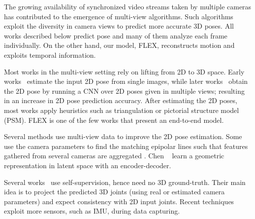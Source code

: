 The growing availability of synchronized video streams taken by multiple cameras has contributed to the emergence of multi-view algorithms. Such algorithms exploit the diversity in camera views to predict more accurate 3D poses. All works described below predict pose and many of them analyze each frame individually. On the other hand, our model, FLEX, reconstructs motion and exploits temporal information. 

Most works in the multi-view setting rely on lifting from 2D to 3D space.
Early works~\cite{Belagiannis_2016_IEEE,detection_complete_graphs,psm_2013} estimate the input 2D pose from single images, while later works~\cite{dong2019fast,qiu2019cross,iskakov2019learnable,he2020epipolar,kocabas2019selfsupervised,chen2019weaklysupervised,chu_and_pan_semisupervised,rhodin2018learning,kadkhodamohammadi2019generalizable,chu2021partaware} obtain the 2D pose by running a CNN over 2D poses given in multiple views; resulting in an increase in 2D pose prediction accuracy.
After estimating the 2D poses, most works apply heuristics such as triangulation or pictorial structure model (PSM). FLEX is one of the few works \cite{iskakov2019learnable,tu2020voxelpose} that present an end-to-end model. 

Several methods 
use multi-view data to improve the 2D pose estimation.
Some use the camera parameters to find the matching epipolar lines %
such that features gathered from several cameras are aggregated \cite{qiu2019cross,he2020epipolar}. 
Chen \etal~ learn a geometric representation in latent space with an encoder-decoder.

Several works~\cite{kocabas2019selfsupervised,chu_and_pan_semisupervised,wandt2020canonpose,tome2018rethinking} use self-supervision, hence need no 3D ground-truth.
Their main idea is to project the predicted 3D joints (using real or estimated camera parameters) and expect consistency with 2D input joints.
%
Recent techniques \cite{huang2019deepfuse,zhang2020fusing} exploit more sensors, such as IMU, during data capturing.
 
